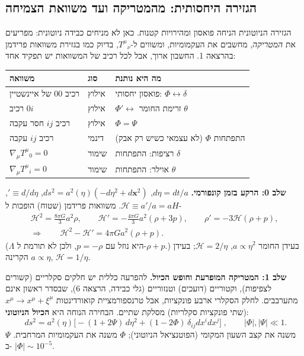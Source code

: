 \subsection{הגזירה היחסותית: מהמטריקה ועד משוואת הצמיחה}
הגזירה הניוטונית הניחה פואסון ומהירויות קטנות. כאן לא מניחים כבידה ניוטונית: מפריעים את \emph{המטריקה}, מחשבים את העקמומיות, ומשווים ל-$T^\mu{}_\nu$, בדיוק כמו בגזירת משוואות פרידמן בהרצאה 1. החשבון ארוך, אבל לכל רכיב של המשוואות יש תפקיד אחד:
\begin{center}\small
\begin{tabular}{@{}lll@{}}
\toprule
משוואה & סוג & מה היא נותנת \\ \midrule
רכיב $00$ של איינשטיין & אילוץ & פואסון יחסותי: $\Phi\leftrightarrow\delta$ \\
רכיב $0i$ & אילוץ & $\Phi'\leftrightarrow$ זרימת החומר $\theta$ \\
רכיב $ij$ חסר עקבה & אילוץ & $\Phi=\Psi$ \\
רכיב $ij$ עקבה & דינמי & התפתחות $\Phi$ (לא עצמאי כשיש רק אבק) \\
$\nabla_\mu T^\mu{}_0=0$ & שימור & רציפות: התפתחות $\delta$ \\
$\nabla_\mu T^\mu{}_i=0$ & שימור & אוילר: התפתחות $\theta$ \\ \bottomrule
\end{tabular}
\end{center}

\textbf{שלב 0: הרקע בזמן קונפורמי.} $d\eta=dt/a$, $ds^2=a^2(\eta)(-d\eta^2+d\mathbf x^2)$, $'\equiv d/d\eta$, $\mathcal H\equiv a'/a=aH$. משוואות פרידמן (שטוח) הופכות ל-
\begin{equation}
\begin{gathered}
\mathcal H^2=\frac{8\pi G}{3}a^2\rho,\qquad \mathcal H'=-\frac{4\pi G}{3}a^2(\rho+3p),\qquad \rho'=-3\mathcal H(\rho+p),\\
\Rightarrow\qquad \mathcal H^2-\mathcal H'=4\pi Ga^2(\rho+p).
\end{gathered}
\label{eq:gr-bg}
\end{equation}
($\Lambda$ היא נוזל עם $p=-\rho$, ולכן לא תורמת ל-$\rho+p$.) בעידן החומר $a\propto\eta^2$, $\mathcal H=2/\eta$; בעידן הקרינה $a\propto\eta$, $\mathcal H=1/\eta$.

\textbf{שלב 1: המטריקה המופרעת וחופש הכיול.} להפרעה כללית יש חלקים סקלריים (קשורים לצפיפות), וקטוריים (דועכים) וטנזוריים (גלי כבידה, הרצאה 6), שבסדר ראשון אינם מתערבבים. לחלק הסקלרי ארבע פונקציות, אבל טרנספורמציית קואורדינטות $x^\mu\to x^\mu+\xi^\mu$ (שתי פונקציות סקלריות) מסלקת שתיים. הבחירה הנוחה היא \textbf{הכיול הניוטוני}:
\begin{equation}
\boxed{\;ds^2=a^2(\eta)\big[-(1+2\Psi)\,d\eta^2+(1-2\Phi)\,\delta_{ij}dx^idx^j\big]\;},\qquad|\Phi|,|\Psi|\ll1 .
\end{equation}
$\Psi$ משנה את קצב השעון המקומי (הפוטנציאל הניוטוני); $\Phi$ משנה את העקמומיות המרחבית. ב- $|\Phi|\sim10^{-5}$.


